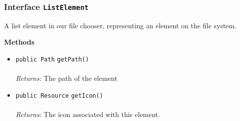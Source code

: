 \subsubsection{Interface \lstinline|ListElement|}
A list element in our file chooser, representing an element on the file system. \\
\noindent\begin{minipage}[t]{5cm}
\vspace{0.3em}
\hspace*{2em}
\vspace{0.3em}
\end{minipage}





\textbf{\sffamily Methods}
\begin{itemize}
\item \lstinline|public Path| \lstinline|getPath|\lstinline|()|\\ \\[-0.6em]
\emph{Returns:} The path of the element



\item \lstinline|public Resource| \lstinline|getIcon|\lstinline|()|\\ \\[-0.6em]
\emph{Returns:} The icon associated with this element.



\end{itemize}


